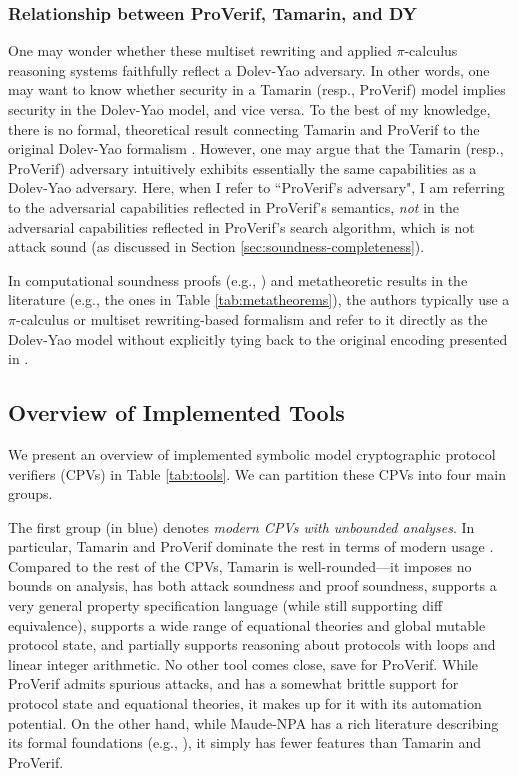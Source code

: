 \documentclass{article}
\theoremstyle{definition}
\begin{document}

\subsubsection{Relationship between ProVerif, Tamarin, and DY} 
One may wonder whether these multiset rewriting and applied $\pi$-calculus reasoning systems 
faithfully reflect a Dolev-Yao adversary. 
In other words, one may want to know whether security in a Tamarin (resp., ProVerif) model 
implies security in the Dolev-Yao model, and vice versa. 
To the best of my knowledge, there is no formal, theoretical result connecting Tamarin and ProVerif to the original 
Dolev-Yao formalism \cite{dolev_yao}.
However, one may argue that the Tamarin (resp., ProVerif) adversary intuitively exhibits essentially the same capabilities 
as a Dolev-Yao adversary.
Here, when I refer to ``ProVerif's adversary", I am referring to the adversarial capabilities 
reflected in ProVerif's semantics, \emph{not} in the adversarial capabilities 
reflected in ProVerif's search algorithm, which is not attack sound 
(as discussed in Section \ref{sec:soundness-completeness}).

In computational soundness proofs (e.g., \cite{comp_soundness,comp_soundness2}) and metatheoretic results in the literature 
(e.g., the ones in Table \ref{tab:metatheorems}), 
the authors typically use a $\pi$-calculus or multiset rewriting-based formalism
and refer to it directly as the Dolev-Yao model without 
explicitly tying back to the original encoding presented in \cite{dolev_yao}.

\subsection{Overview of Implemented Tools}
We present an overview of implemented symbolic model cryptographic protocol verifiers (CPVs) in Table \ref{tab:tools}. 
We can partition these CPVs into four main groups.

The first group (in blue) denotes \emph{modern CPVs with unbounded analyses}. 
In particular, Tamarin and ProVerif dominate the rest in terms of modern usage \cite{sok}. 
Compared to the rest of the CPVs, Tamarin is well-rounded---it imposes no bounds on analysis, 
has both attack soundness and proof soundness, supports a very general property specification language 
(while still supporting diff equivalence), supports a wide range of equational theories and 
global mutable protocol state, and partially supports reasoning about protocols with loops and linear integer arithmetic. 
No other tool comes close, save for ProVerif. While ProVerif admits spurious attacks, 
and has a somewhat brittle support for protocol state and equational theories, 
it makes up for it with its automation potential. 
On the other hand, while Maude-NPA has a rich literature describing its formal foundations (e.g., \cite{maude_npa,folding_variant_narrowing,fvp_unification}),
it simply has fewer features than Tamarin and ProVerif.
\end{document}
